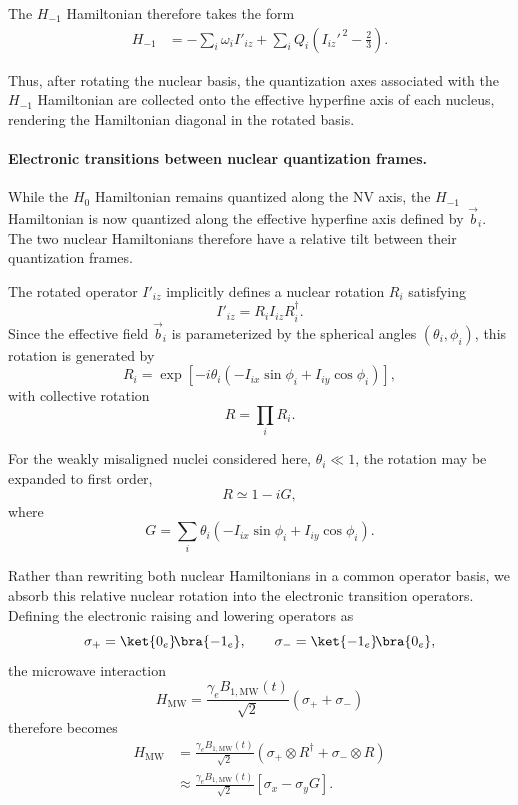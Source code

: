 \documentclass[
  aps,
  pra,
  reprint,            %
  superscriptaddress, %
  amsmath,amssymb,
  notitlepage
]{revtex4-2}
\begin{document}
The $H_{-1}$ Hamiltonian therefore takes the form
\begin{align}
H_{-1}
&=
-\sum_i\omega_i I'_{iz}
+
\sum_iQ_i\!\left(I_{iz}'^{\,2}-\tfrac23\right).
\label{eq:H-1_rot}
\end{align}

Thus, after rotating the nuclear basis, the quantization axes associated with the $H_{-1}$ Hamiltonian are collected onto the effective hyperfine axis of each nucleus, rendering the Hamiltonian diagonal in the rotated basis.\\

\paragraph{Electronic transitions between nuclear quantization frames.}

While the $H_0$ Hamiltonian remains quantized along the NV axis, the $H_{-1}$ Hamiltonian is now quantized along the effective hyperfine axis defined by $\vec b_i$. The two nuclear Hamiltonians therefore have a relative tilt between their quantization frames.

The rotated operator \(I'_{iz}\) implicitly defines a nuclear rotation
\(R_i\) satisfying
\[
I'_{iz}=R_i I_{iz} R_i^\dagger.
\]
Since the effective field \(\vec b_i\) is parameterized by the spherical angles \((\theta_i,\phi_i)\), this rotation is generated by
\[
R_i
=
\exp\!\left[
-i\theta_i
\left(
-I_{ix}\sin\phi_i
+
I_{iy}\cos\phi_i
\right)
\right],
\]
with collective rotation
\[
R=\prod_iR_i.
\]

For the weakly misaligned nuclei considered here,  \(\theta_i\ll1\), the rotation may be expanded to first order,
\[
R
\simeq
1-iG,
\]
where
\[
G
=
\sum_i\theta_i
\left(
-I_{ix}\sin\phi_i
+
I_{iy}\cos\phi_i
\right).
\]

Rather than rewriting both nuclear Hamiltonians in a common operator basis, we absorb this relative nuclear rotation into the electronic transition operators. Defining the electronic raising and lowering operators as
\[
\sigma_+
=
\ket{0_e}\!\bra{-1_e},
\qquad
\sigma_-
=
\ket{-1_e}\!\bra{0_e},
\]
the microwave interaction
\[
H_{\mathrm{MW}}
=
\frac{\gamma_eB_{1,\mathrm{MW}}(t)}{\sqrt2}
(\sigma_+ + \sigma_-)
\]
therefore becomes
\begin{equation}
\begin{aligned}
H_{\mathrm{MW}}
&=
\frac{\gamma_eB_{1,\mathrm{MW}}(t)}{\sqrt2}
\left(
\sigma_+\otimes R^\dagger
+
\sigma_-\otimes R
\right)
\\
&\approx
\frac{\gamma_eB_{1,\mathrm{MW}}(t)}{\sqrt2}
\left[
\sigma_x
-
\sigma_y G
\right].
\end{aligned}
\label{eq:HMW_rot_first_order}
\end{equation}
\end{document}
